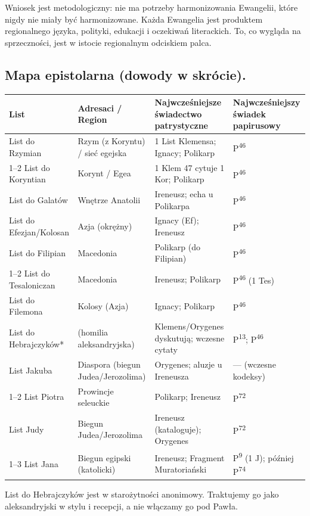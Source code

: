 Wniosek jest metodologiczny: nie ma potrzeby harmonizowania Ewangelii, które nigdy nie miały być harmonizowane.
Każda Ewangelia jest produktem regionalnego języka, polityki, edukacji i oczekiwań literackich.
To, co wygląda na sprzeczności, jest w istocie regionalnym odciskiem palca.

\subsection{Mapa epistolarna (dowody w skrócie).}
\begin{center}
\begin{tabular}{@{}p{3.1cm}p{3.3cm}p{3.8cm}p{4.0cm}@{}}
\toprule
\textbf{List} & \textbf{Adresaci / Region} & \textbf{Najwcześniejsze świadectwo patrystyczne} & \textbf{Najwcześniejszy świadek papirusowy} \\
\midrule
List do Rzymian & Rzym (z Koryntu) / sieć egejska & 1 List Klemensa; Ignacy; Polikarp & P\textsuperscript{46} \\
1–2 List do Koryntian & Korynt / Egea & 1 Klem 47 cytuje 1 Kor; Polikarp & P\textsuperscript{46} \\
List do Galatów & Wnętrze Anatolii & Ireneusz; echa u Polikarpa & P\textsuperscript{46} \\
List do Efezjan/Kolosan & Azja (okrężny) & Ignacy (Ef); Ireneusz & P\textsuperscript{46} \\
List do Filipian & Macedonia & Polikarp (do Filipian) & P\textsuperscript{46} \\
1–2 List do Tesaloniczan & Macedonia & Ireneusz; Polikarp & P\textsuperscript{46} (1 Tes) \\
List do Filemona & Kolosy (Azja) & Ignacy; Polikarp & P\textsuperscript{46} \\
List do Hebrajczyków* & (homilia aleksandryjska) & Klemens/Orygenes dyskutują; wczesne cytaty & P\textsuperscript{13}; P\textsuperscript{46} \\
List Jakuba & Diaspora (biegun Judea/Jerozolima) & Orygenes; aluzje u Ireneusza & --- (wczesne kodeksy) \\
1–2 List Piotra & Prowincje seleuckie & Polikarp; Ireneusz & P\textsuperscript{72} \\
List Judy & Biegun Judea/Jerozolima & Ireneusz (kataloguje); Orygenes & P\textsuperscript{72} \\
1–3 List Jana & Biegun egipski (katolicki) & Ireneusz; Fragment Muratoriański & P\textsuperscript{9} (1 J); później P\textsuperscript{74} \\
\bottomrule
\end{tabular}
\end{center}
\noindent *List do Hebrajczyków jest w starożytności anonimowy.
Traktujemy go jako aleksandryjski w stylu i recepcji, a nie włączamy go pod Pawła.

